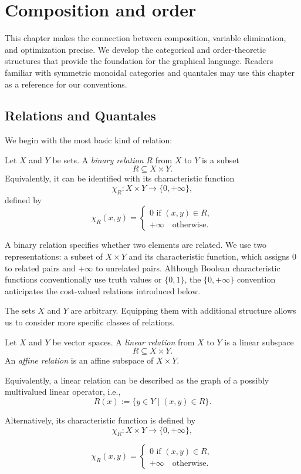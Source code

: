 \chapter{Composition and order}

This chapter makes the connection between composition, variable elimination,
and optimization precise. We develop the categorical and order-theoretic
structures that provide the foundation for the graphical language.
Readers familiar with symmetric monoidal categories and quantales may use
this chapter as a reference for our conventions.

\section{Relations and Quantales}

We begin with the most basic kind of relation:

\begin{definition}\label{def:binary-relations}
	Let $X$ and $Y$ be sets. A \emph{binary relation} $R$ from $X$ to $Y$ is a subset
	\[
		R \subseteq X \times Y.
	\]
	Equivalently, it can be identified with its characteristic function
	\[
		\chi_R : X \times Y \to \{0,+\infty\},
	\]
	defined by
	\[
		\chi_R(x,y) =
		\begin{cases}
			0  \text{ if } (x,y) \in R, \\
			+\infty \quad \text{otherwise}.
		\end{cases}
	\]
\end{definition}

A binary relation specifies whether two elements are related. We use two
representations: a subset of $X\times Y$ and its characteristic function,
which assigns $0$ to related pairs and $+\infty$ to unrelated pairs.
Although Boolean characteristic functions conventionally use truth values or
$\{0,1\}$, the $\{0,+\infty\}$ convention anticipates the cost-valued
relations introduced below.

The sets $X$ and $Y$ are arbitrary. Equipping them with additional structure
allows us to consider more specific classes of relations.
\begin{definition}
	Let $X$ and $Y$ be vector spaces. A \emph{linear relation} from $X$ to $Y$ is a linear subspace
	\[
		R \subseteq X \times Y.
	\]
	An \emph{affine relation} is an affine subspace of $X \times Y$.

	Equivalently, a linear relation can be described as the graph of a possibly multivalued linear operator, i.e.,
	\[
		R(x) := \{ y \in Y \mid (x,y) \in R \}.
	\]

	Alternatively, its characteristic function is defined by
	\[
		\chi_R : X \times Y \to \{0,+\infty\},
	\]

	\[
		\chi_R(x,y) =
		\begin{cases}
			0  \text{ if } (x,y) \in R, \\
			+\infty \quad \text{otherwise}.
		\end{cases}
	\]

\end{definition}

